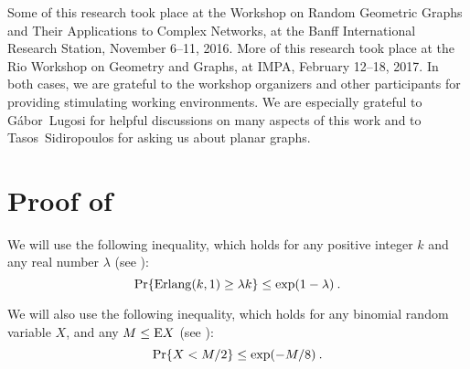 \documentclass{patmorin}
\DeclareMathOperator{\erlang}{Erlang}
\begin{document}
Some of this research took place at the Workshop on Random Geometric
Graphs and Their Applications to Complex Networks, at the Banff
International Research Station, November 6--11, 2016.  More of this
research took place at the Rio Workshop on Geometry and Graphs, at IMPA,
February 12--18, 2017.  In both cases, we are grateful to the workshop
organizers and other participants for providing stimulating working
environments.  We are especially grateful to G\'abor~Lugosi for helpful
discussions on many aspects of this work and to Tasos~Sidiropoulos
for asking us about planar graphs.



\appendix

\section{Proof of~}

We will use the following inequality, which holds for any positive integer $k$ and any real number $\lambda$
(see \cite[Theorem~5.1(ii)]{janson}):
\begin{equation}
\eqlabel{simpleerlang}
\Pr\{\erlang(k,1) \geq \lambda k\}
\leq\exp(1-\lambda) \:.
\end{equation}

We will also use the following inequality, which holds for any binomial random variable $X$, and any $M\leq\mathrm{E} X$ (see \cite[Theorem~2.3(c)]{McDiarmid1998}):
\begin{equation}
\eqlabel{binomialhalf}
\Pr\{X < M/2\} \leq \exp(-M/8)\:.
\end{equation}
\end{document}
